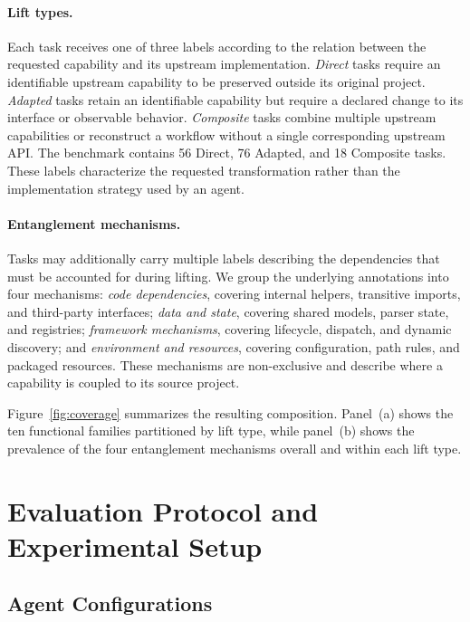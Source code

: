 \documentclass[acmsmall,screen,review,anonymous]{acmart}
\begin{document}
\paragraph{Lift types.}
Each task receives one of three labels according to the relation between the
requested capability and its upstream implementation. \emph{Direct} tasks
require an identifiable upstream capability to be preserved outside its original
project. \emph{Adapted} tasks retain an identifiable capability but require a
declared change to its interface or observable behavior.
\emph{Composite} tasks combine multiple upstream capabilities or reconstruct a
workflow without a single corresponding upstream API. The benchmark contains 56
Direct, 76 Adapted, and 18 Composite tasks. These labels characterize the
requested transformation rather than the implementation strategy used by an
agent.

\paragraph{Entanglement mechanisms.}
Tasks may additionally carry multiple labels describing the dependencies that
must be accounted for during lifting. We group the underlying annotations into
four mechanisms: \emph{code dependencies}, covering internal helpers, transitive
imports, and third-party interfaces; \emph{data and state}, covering shared
models, parser state, and registries; \emph{framework mechanisms}, covering
lifecycle, dispatch, and dynamic discovery; and \emph{environment and
resources}, covering configuration, path rules, and packaged resources. These
mechanisms are non-exclusive and describe where a capability is coupled to its
source project.

Figure~\ref{fig:coverage} summarizes the resulting composition. Panel~(a) shows
the ten functional families partitioned by lift type, while panel~(b) shows the
prevalence of the four entanglement mechanisms overall and within each lift
type.



\section{Evaluation Protocol and Experimental Setup}
\label{sec:protocol}

\subsection{Agent Configurations}
\end{document}
